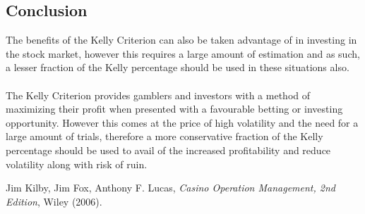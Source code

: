 \documentclass[12pt]{article}
\begin{document}
\subsection{Conclusion}
The benefits of the Kelly Criterion can also be taken advantage of in investing in the stock market, however this requires a large amount of estimation and as such, a lesser fraction of the Kelly percentage should be used in these situations also.
\\\\
The Kelly Criterion provides gamblers and investors with a method of maximizing their profit when presented with a favourable betting or investing opportunity. However this comes at the price of high volatility and the need for a large amount of trials, therefore a more conservative fraction of the Kelly percentage should be used to avail of the increased profitability and reduce volatility along with risk of ruin.
\begin{thebibliography}{3}
  Jim Kilby, Jim Fox, Anthony F. Lucas,
  \emph{Casino Operation Management, 2nd Edition},
  Wiley (2006).
\end{thebibliography}
\end{document}
